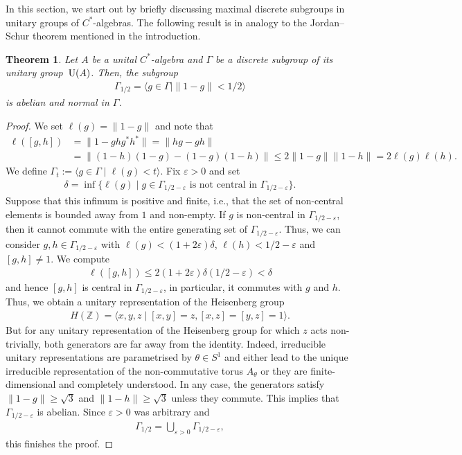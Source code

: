 \documentclass[pdftex]{sigma}
\numberwithin{equation}{section}
\newtheorem{Theorem}{Theorem}[section]
\begin{document}
In this section, we start out by briefly discussing maximal discrete subgroups in unitary groups of $C^*$-algebras. The following result is in analogy to the Jordan--Schur theorem mentioned in the introduction.

{\sloppy\begin{Theorem}\label{cstar}
Let $A$ be a unital $C^*$-algebra and $\Gamma$ be a discrete subgroup of its unitary group~${\rm U}(A)$. Then, the subgroup
\begin{gather*}
\Gamma_{1/2} = \langle g \in \Gamma \mid \|1-g\|<1/2 \rangle
\end{gather*}
is abelian and normal in $\Gamma$.
\end{Theorem}}

\begin{proof}
We set $\ell(g)=\|1-g\|$ and note that
\begin{align*}
\ell([g,h]) &= \|1-ghg^*h^*\| = \|hg-gh\| \\
&= \|(1-h)(1-g)-(1-g)(1-h)\| \leq 2 \|1-g\|\|1-h\| = 2 \ell(g) \ell(h).
\end{align*}
We define $\Gamma_{t} := \langle g \in \Gamma \mid \ell(g)<t \rangle$.
Fix $\varepsilon>0$ and set
\begin{gather*}
\delta = \inf\{\ell(g) \mid g \in \Gamma_{1/2-\varepsilon} \mbox{ is not central in } \Gamma_{1/2-\varepsilon}\}.
\end{gather*}
Suppose that this infimum is positive and finite, i.e., that the set of non-central elements is bounded away from $1$ and non-empty. If $g$ is non-central in $\Gamma_{1/2-\varepsilon}$, then it cannot commute with the entire generating set of $\Gamma_{1/2-\varepsilon}$. Thus, we can consider $g,h \in \Gamma_{1/2-\varepsilon}$ with $\ell(g) < (1+2\varepsilon)\delta$, $\ell(h)<1/2 - \varepsilon$ and $[g,h] \neq 1$. We compute
\begin{gather*}
\ell([g,h]) \leq 2 (1+2\varepsilon)\delta (1/2-\varepsilon)<\delta
\end{gather*}
and hence $[g,h]$ is central in $\Gamma_{1/2-\varepsilon}$, in particular, it commutes with $g$ and $h$. Thus, we obtain a unitary representation of the Heisenberg group
\begin{gather*}
H(\mathbb Z) = \langle x,y,z \mid [x,y]=z, [x,z]=[y,z]=1 \rangle.
\end{gather*}
But for any unitary representation of the Heisenberg group for which $z$ acts non-trivially, both generators are far away from the identity. Indeed, irreducible unitary representations are parametrised by $\theta \in S^1$ and either lead to the unique irreducible representation of the non-commutative torus $A_{\theta}$ or they are finite-dimensional and completely understood. In any case, the generators satisfy $\|1-g\| \geq \sqrt{3}$ and $\|1-h\| \geq \sqrt{3}$ unless they commute. This implies that $\Gamma_{1/2-\varepsilon}$ is abelian. Since $\varepsilon>0$ was arbitrary and
\begin{gather*}
\Gamma_{1/2} = \bigcup_{\varepsilon>0} \Gamma_{1/2-\varepsilon},
\end{gather*}
this finishes the proof.
\end{proof}
\end{document}

